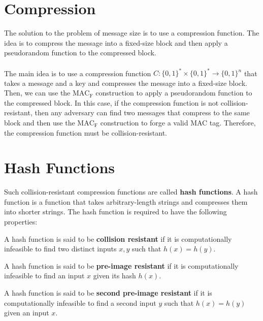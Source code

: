 \documentclass{article}
\begin{document}
\section{Compression}
The solution to the problem of message size is to use a compression function. The idea is to compress the message into a fixed-size block and then apply a pseudorandom function to the compressed block. \\ \\ 
The main idea is to use a compression function $C: \{0,1\}^* \times \{0,1\}^* \rightarrow \{0,1\}^n$ that takes a message and a key and compresses the message into a fixed-size block. Then, we can use the $\operatorname{MAC_F}$ construction to apply a pseudorandom function to the compressed block. In this case, if the compression function is not collision-resistant, then any adversary can find two messages that compress to the same block and then use the $\operatorname{MAC_F}$ construction to forge a valid MAC tag. Therefore, the compression function must be collision-resistant.
\section{Hash Functions}
Such collision-resistant compression functions are called \textbf{hash functions}. A hash function is a function that takes arbitrary-length strings and compresses them into shorter strings. The hash function is required to have the following properties:
\begin{definition}
    A hash function is said to be \textbf{collision resistant} if it is computationally infeasible to find two distinct inputs $x, y$ such that $h(x) = h(y)$.
\end{definition}
\begin{definition}
    A hash function is said to be \textbf{pre-image resistant} if it is computationally infeasible to find an input $x$ given its hash $h(x)$. 
\end{definition}
\begin{definition}
    A hash function is said to be \textbf{second pre-image resistant} if it is computationally infeasible to find a second input $y$ such that $h(x) = h(y)$ given an input $x$.
\end{definition}


\cite{katz2014introduction}
\end{document}
